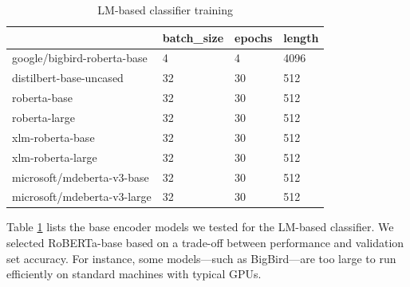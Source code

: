 \documentclass[11pt]{article}
\begin{document}
	\begin{table}[]
		\small
		\caption{LM-based classifier training}
		\begin{tabular}{@{}l|lll@{}}
			\toprule
			& \multicolumn{1}{l|}{batch\_size} & \multicolumn{1}{l|}{epochs} & \multicolumn{1}{l|}{length} \\ \midrule
			\multicolumn{1}{|l|}{google/bigbird-roberta-base} & 4                                & 4                           & 4096                             \\ \cmidrule(r){1-1}
			\multicolumn{1}{|l|}{distilbert-base-uncased}     & 32                               & 30                          & 512                              \\ \cmidrule(r){1-1}
			\multicolumn{1}{|l|}{roberta-base}                & 32                               & 30                          & 512                              \\ 
			\cmidrule(r){1-1}
			\multicolumn{1}{|l|}{roberta-large}                & 32                               & 30                          & 512                              \\ 
			\cmidrule(r){1-1}
			\multicolumn{1}{|l|}{xlm-roberta-base}            & 32                               & 30                          & 512                              \\ \cmidrule(r){1-1}
			\multicolumn{1}{|l|}{xlm-roberta-large}           & 32                               & 30                          & 512                              \\ \cmidrule(r){1-1}
			\multicolumn{1}{|l|}{microsoft/mdeberta-v3-base}  & 32                               & 30                          & 512                              \\ \cmidrule(r){1-1}
			\multicolumn{1}{|l|}{microsoft/mdeberta-v3-large} & 32                               & 30                          & 512                              \\ \bottomrule
		\end{tabular}
		\label{table:3}
	\end{table}
	
	Table \ref{table:3} lists the base encoder models we tested for the LM-based classifier. We selected RoBERTa-base based on a trade-off between performance and validation set accuracy. For instance, some models—such as BigBird—are too large to run efficiently on standard machines with typical GPUs.
\end{document}
